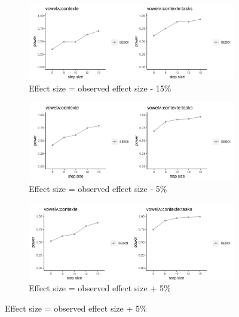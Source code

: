 \documentclass[12 pt]{article}
\begin{document}
\begin{figure} \label{figure_power_analysis_f1}
	\centering
	\begin{subfigure}[t]{0.8\textwidth}
		\centering
		\includegraphics[width=\textwidth]{powerplot_f1_minus15} 
		\caption{Effect size = observed effect size - 15\%} \label{f1_minus15}
	\end{subfigure}
	
	\begin{subfigure}[t]{0.8\textwidth}
		\centering
		\includegraphics[width=\textwidth]{powerplot_f1_minus5} 
		\caption{Effect size = observed effect size - 5\%} \label{f1_minus5}
	\end{subfigure}
	
	
	\begin{subfigure}[t]{0.8\textwidth}
		\centering
		\includegraphics[width=\textwidth]{powerplot_f1_plus5} 
		\caption{Effect size = observed effect size + 5\%} \label{f1_plus5}
	\end{subfigure}



\end{figure}
\end{document}
